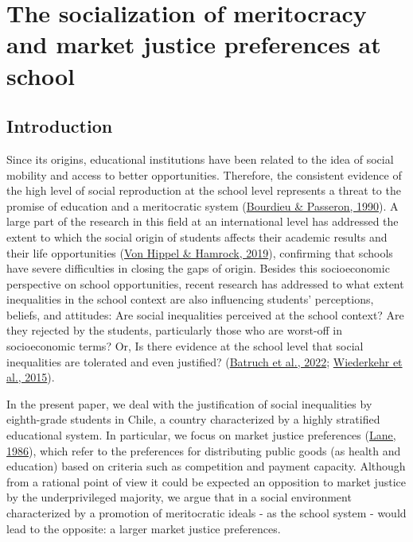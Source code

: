 \documentclass[
  letterpaper,
  DIV=11,
  numbers=noendperiod]{scrartcl}
\author{Equipo EDUMER}
\date{}
\begin{document}
\ifdefined\Shaded\renewenvironment{Shaded}{\begin{tcolorbox}[frame hidden, breakable, enhanced, borderline west={3pt}{0pt}{shadecolor}, interior hidden, sharp corners, boxrule=0pt]}{\end{tcolorbox}}\fi

\hypertarget{the-socialization-of-meritocracy-and-market-justice-preferences-at-school}{%
\section{The socialization of meritocracy and market justice preferences
at
school}\label{the-socialization-of-meritocracy-and-market-justice-preferences-at-school}}

\hypertarget{introduction}{%
\subsection{Introduction}\label{introduction}}

Since its origins, educational institutions have been related to the
idea of social mobility and access to better opportunities. Therefore,
the consistent evidence of the high level of social reproduction at the
school level represents a threat to the promise of education and a
meritocratic system
(\protect\hyperlink{ref-bourdieu_reproduction_1990}{Bourdieu \&
Passeron, 1990}). A large part of the research in this field at an
international level has addressed the extent to which the social origin
of students affects their academic results and their life opportunities
(\protect\hyperlink{ref-vonhippel_test_2019}{Von Hippel \& Hamrock,
2019}), confirming that schools have severe difficulties in closing the
gaps of origin. Besides this socioeconomic perspective on school
opportunities, recent research has addressed to what extent inequalities
in the school context are also influencing students' perceptions,
beliefs, and attitudes: Are social inequalities perceived at the school
context? Are they rejected by the students, particularly those who are
worst-off in socioeconomic terms? Or, Is there evidence at the school
level that social inequalities are tolerated and even justified?
(\protect\hyperlink{ref-batruch_belief_2022}{Batruch et al., 2022};
\protect\hyperlink{ref-wiederkehr_belief_2015}{Wiederkehr et al.,
2015}).

In the present paper, we deal with the justification of social
inequalities by eighth-grade students in Chile, a country characterized
by a highly stratified educational system. In particular, we focus on
market justice preferences
(\protect\hyperlink{ref-lane_market_1986}{Lane, 1986}), which refer to
the preferences for distributing public goods (as health and education)
based on criteria such as competition and payment capacity. Although
from a rational point of view it could be expected an opposition to
market justice by the underprivileged majority, we argue that in a
social environment characterized by a promotion of meritocratic ideals -
as the school system - would lead to the opposite: a larger market
justice preferences.
\end{document}
